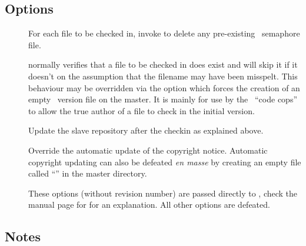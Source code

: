 \subsection*{Options}

\begin{description}
\item[]
   For each file to be checked in, invoke  to delete any
   pre-existing \rcs\ semaphore file.

\item[]
    normally verifies that a file to be checked in does exist and will
   skip it if it doesn't on the assumption that the filename may have been
   misspelt.  This behaviour may be overridden via the  option which
   forces the creation of an empty \rcs\ version file on the master.  It is
   mainly for use by the \aipspp\ ``code cops'' to allow the true author of a
   file to check in the initial version.

\item[]
   Update the slave repository after the checkin as explained above.

\item[]
   Override the automatic update of the copyright notice.  Automatic copyright
   updating can also be defeated \emph{en masse} by creating an empty file
   called ``'' in the master directory.

\item[]
   These options (without revision number) are passed directly to
   , check the manual page for  for an explanation.
   All other  options are defeated.
\end{description}

\subsection*{Notes}

